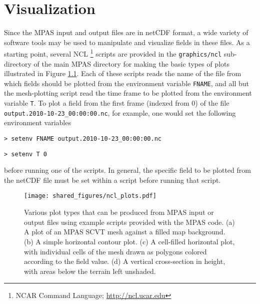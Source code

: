 
\chapter{Visualization}
\label{chap:mpas_visualization}

Since the MPAS input and output files are in netCDF format, a wide variety of software
tools may be used to manipulate and visualize fields in these files. As a starting point, several NCL \footnote{NCAR Command Language; \url{http://ncl.ucar.edu}}
scripts are provided in the {\tt graphics/ncl} sub-directory
of the main MPAS directory for making the basic types of plots illustrated in Figure \ref{fig:ncl_plots}. Each of
these scripts reads the name of the file from which fields should be plotted from the environment variable {\tt FNAME},
and all but the mesh-plotting script read the time frame to be plotted from the environment variable {\tt T}. To plot
a field from the first frame (indexed from 0) of the file {\tt output.2010-10-23\_00:00:00.nc}, for example, one would set the 
following environment variables 

\vspace{12pt}
{\tt > setenv FNAME output.2010-10-23\_00:00:00.nc}

{\tt > setenv T 0}
\vspace{12pt}

\noindent before running one of the scripts. In general, the specific field to be plotted from the netCDF file must be set 
within a script before running that script. 

\begin{figure}[htb]
\begin{center}
\texttt{[image: shared\_figures/ncl\_plots.pdf]}
\caption{Various plot types that can be produced from MPAS input or output files using example scripts provided with the MPAS code.
(a) A plot of an MPAS SCVT mesh against a filled map background. (b) A simple horizontal contour plot. (c) A cell-filled horizontal plot, with
individual cells of the mesh drawn as polygons colored according to the field value. (d) A vertical cross-section in height, with areas below the
terrain left unshaded.}
\label{fig:ncl_plots}
\end{center}
\end{figure}


